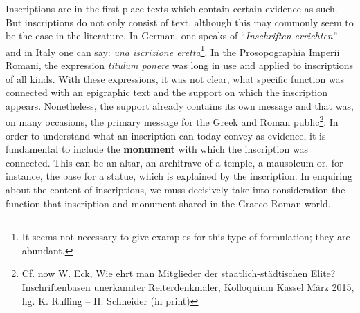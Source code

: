 \documentclass[amsthm,ebook]{saparticle}
\begin{document}
Inscriptions are in the first place texts which contain certain evidence as such. 
But inscriptions do not only consist of text, although this may commonly seem to 
be the case in the literature. In German, one speaks of ``\textit{Inschriften 
errichten}'' and in Italy one can say: \textit{una iscrizione eretta}\footnote{It seems not necessary to give examples for this type of formulation; they are abundant.}. In the Prosopographia 
Imperii Romani,\textit{ }the expression \textit{titulum ponere }was long in use 
and applied to inscriptions of all kinds. With these expressions, it was not clear, 
what specific function was connected with an epigraphic text and the support on 
which the inscription appears. Nonetheless, the support already contains its own 
message and that was, on many occasions, the primary message for the Greek and 
Roman public\footnote{\label{fn:12}Cf. now W. Eck, Wie ehrt man Mitglieder der staatlich-städtischen Elite? Inschriftenbasen unerkannter Reiterdenkmäler, Kolloquium Kassel März 2015, hg. K. Ruffing – H. Schneider (in print)}. In order to understand what an inscription can today convey as evidence, 
it is fundamental to include the \textbf{monument }with which the inscription was 
connected. This can be an altar, an architrave of a temple, a mausoleum or, for 
instance, the base for a statue, which is explained by the inscription. In enquiring 
about the content of inscriptions, we muss decisively take into consideration the 
function that inscription and monument shared in the Graeco-Roman world. 
\end{document}
